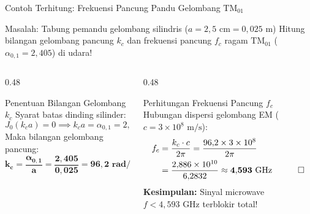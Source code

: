 \documentclass[aspectratio=169,10pt]{beamer}
\begin{document}
\begin{frame}{Contoh Terhitung: Frekuensi Pancung Pandu Gelombang $\text{TM}_{01}$}
  \begin{exampleblock}{Masalah: Tabung pemandu gelombang silindris ($a = 2{,}5\text{ cm} = 0{,}025\text{ m}$)}
    Hitung bilangan gelombang pancung $k_c$ dan frekuensi pancung $f_c$ ragam $\text{TM}_{01}$ ($\alpha_{0,1} = 2{,}405$) di udara!
  \end{exampleblock}
  \vspace{-0.05cm}
  \begin{columns}[t]
    \begin{column}{0.48\textwidth}
      \begin{block}{Penentuan Bilangan Gelombang $k_c$}
        \small
        Syarat batas dinding silinder:
        \begin{equation*}
          J_0(k_c a) = 0 \implies k_c a = \alpha_{0,1} = 2{,}405
        \end{equation*}
        Maka bilangan gelombang pancung:
        \begin{equation*}
          \mathbf{k_c = \frac{\alpha_{0,1}}{a} = \frac{2{,}405}{0{,}025} = 96{,}2\text{ rad/m}}
        \end{equation*}
      \end{block}
    \end{column}
    \begin{column}{0.48\textwidth}
      \begin{alertblock}{Perhitungan Frekuensi Pancung $f_c$}
        \small
        Hubungan dispersi gelombang EM ($c = 3 \times 10^8\text{ m/s}$):
        \begin{align*}
          f_c &= \frac{k_c \cdot c}{2\pi} = \frac{96{,}2 \times 3 \times 10^8}{2\pi} \\
              &= \frac{2{,}886 \times 10^{10}}{6{,}2832} \approx \mathbf{4{,}593\text{ GHz}} \quad \qed
        \end{align*}
        \textbf{Kesimpulan:} Sinyal microwave $f < 4{,}593\text{ GHz}$ terblokir total!
      \end{alertblock}
    \end{column}
  \end{columns}
\end{frame}
\end{document}
